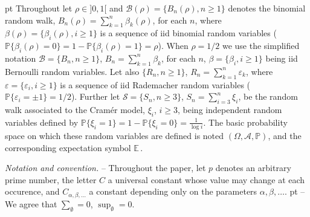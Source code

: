 \documentclass[11pt,draft,reqno]{amsart}
\theoremstyle{definition}
\theoremstyle{remarks}
\numberwithin{equation}{section}
\def \a{{\alpha}}
\def \b{{\beta}}
\def \e{{\varepsilon}}
\def \O{{\Omega}}
\def \noi{{\noindent}}
\def\A{{\mathcal A}}
\def\P{{\mathcal P}}
\def\E{{\mathbb E \,}}
\def\P{{\mathbb P}}
\begin{document}
   pt  Throughout  let     $\rho\in ]0,1[$ and $\mathcal B(\rho)=\{B_n(\rho), n\ge 1\}$ denotes  the binomial random walk,   $B_n(\rho)=\sum_{k=1}^n \b_k(\rho)$, for each $n$, where  $\b(\rho)=
\{\b_i(\rho) , i\ge 1\}$ is a sequence of iid  binomial random variables ($\P\{\b_i(\rho)=0\} =1-\P\{\b_i(\rho)= 1\}=\rho $).  When $\rho =1/2$ we use the simplified notation $\mathcal B =\{B_n , n\ge 1\}$, $B_n =\sum_{k=1}^n \b_k $, for each $n$,    $\b =
\{\b_i  , i\ge 1\}$ 
  being iid Bernoulli random variables.
    Let also $\{R_n, n\ge 1\}$, $R_n=\sum_{k=1}^n \e_k$,  where  $\e=
\{\e_i , i\ge 1\}$ is  a sequence of iid 
Rademacher random variables ($\P\{ \e_i =\pm 1\} =1/2$). Further let   $\mathcal S= \{S_n, n\ge 3\}$, $S_n=\sum_{i=3}^n \xi_i$, be the random walk associated to the Cram\'er model,   $\xi_i$,  $i\ge 3$, being independent
  random variables defined by $\P\{\xi_i= 1\}=  1-\P\{\xi_i= 0\}= \frac1{\log i}$. The basic probability space on which these random variables are defined is noted $(\O,\A,\P)$, and the  corresponding expectation symbol $\E$.
  \smallskip\par
  
\smallskip\par 

\smallskip\par
 
  

\medskip\par
 {\it Notation and convention.}    
-- Throughout the paper,  let  
$p$   denotes an arbitrary prime number,   the letter $C$   a universal constant whose value may change at each occurence, and   $C_{\a, \b, \ldots}$     a constant depending only on the parameters ${\a, \b, \ldots}$. 
 pt 
\noi -- We agree that $\sum_{\emptyset}=0$, $\sup_{\emptyset}=0$. 
\end{document}
